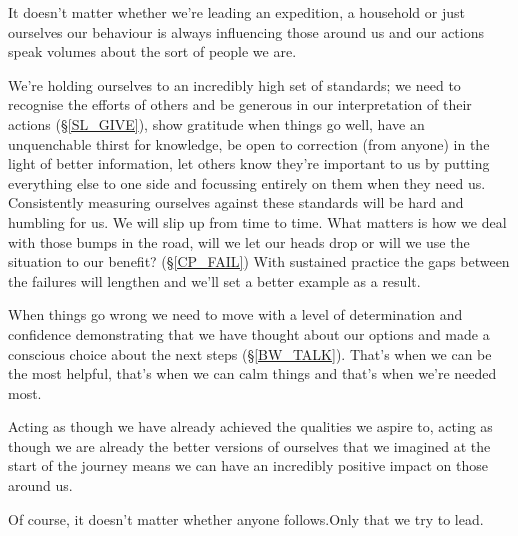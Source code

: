 \cleardoublepage
{\small

It doesn't matter whether we're leading an expedition, a household or just ourselves our behaviour is always influencing those around us and our actions speak volumes about the sort of people we are.

We're holding ourselves to an incredibly high set of standards; we need to recognise the efforts of others and be generous in our interpretation of their actions (\S \ref{SL_GIVE}), show gratitude when things go well, have an unquenchable thirst for knowledge, be open to correction (from anyone) in the light of better information, let others know they're important to us by putting everything else to one side and focussing entirely on them when they need us. Consistently measuring ourselves against these standards will be hard and humbling for us. We will slip up from time to time. What matters is how we deal with those bumps in the road, will we let our heads drop or will we use the situation to our benefit? (\S \ref{CP_FAIL}) With sustained practice the gaps between the failures will lengthen and we'll set a better example as a result.

When things go wrong we need to move with a level of determination and confidence demonstrating that we have thought about our options and made a conscious choice about the next steps (\S \ref{BW_TALK}). That's when we can be the most helpful, that's when we can calm things and that's when we're needed most.

Acting as though we have already achieved the qualities we aspire to, acting as though we are already the better versions of ourselves that we imagined at the start of the journey means we can have an incredibly positive impact on those around us.

Of course, it doesn't matter whether anyone follows.\newline Only that we try to lead.

}
\clearpage
